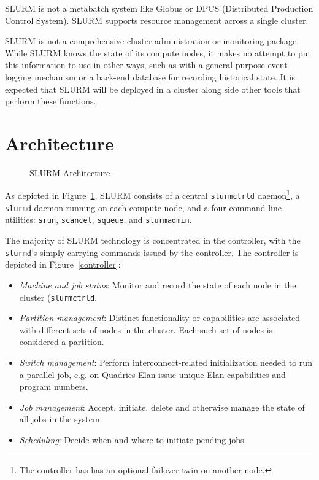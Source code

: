SLURM is not a metabatch system like Globus or DPCS (Distributed Production 
Control System).  SLURM supports resource management across a single cluster.

SLURM is not a comprehensive cluster administration or monitoring package.  
While SLURM knows the state of its compute nodes, it makes no attempt to put
this information to use in other ways, such as with a general purpose event
logging mechanism or a back-end database for recording historical state.
It is expected that SLURM will be deployed in a cluster along side other 
tools that perform these functions. 

\section{Architecture}

\begin{figure}
\caption{SLURM Architecture}
\label{arch}
\end{figure}

As depicted in Figure~\ref{arch}, SLURM consists of a central
{\tt slurmctrld} daemon\footnote{The controller has has an optional failover
twin on another node.}, a {\tt slurmd} daemon running on each compute node, 
and a four command line utilities: {\tt srun}, {\tt scancel}, {\tt squeue},
and {\tt slurmadmin}.

The majority of SLURM technology is concentrated in the controller, with 
the {\tt slurmd}'s simply carrying commands issued by the controller.
The controller is depicted in Figure~\ref{controller}:

\begin{itemize}
\item {\em Machine and job status}: Monitor and record the state of each 
node in the cluster ({\tt slurmctrld}.

\item {\em Partition management}: Distinct functionality or capabilities 
are associated with different sets of nodes in the cluster.  Each such set 
of nodes is considered a partition. 

\item {\em Switch management}: Perform interconnect-related 
initialization needed to run a parallel job, e.g. on Quadrics Elan issue
unique Elan capabilities and program numbers.

\item {\em Job management}: Accept, initiate, delete and otherwise manage 
the state of all jobs in the system.

\item {\em Scheduling}: Decide when and where to initiate pending jobs.

\end{itemize}

